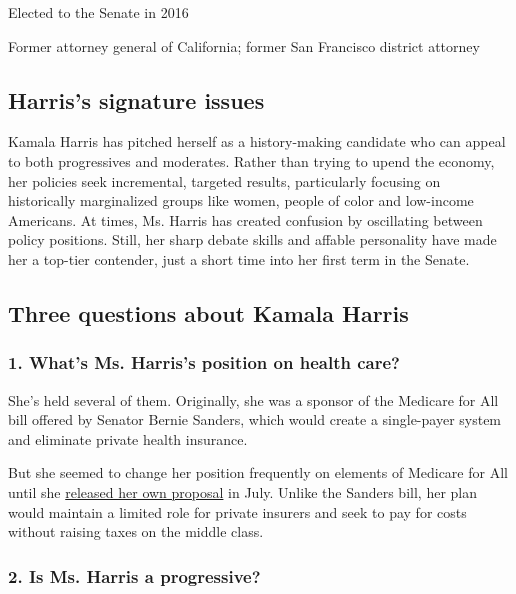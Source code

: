 Elected to the Senate in 2016

Former attorney general of California; former San Francisco district
attorney

\hypertarget{harriss-signature-issues}{%
\subsection{Harris's signature issues}\label{harriss-signature-issues}}

Kamala Harris has pitched herself as a history-making candidate who can
appeal to both progressives and moderates. Rather than trying to upend
the economy, her policies seek incremental, targeted results,
particularly focusing on historically marginalized groups like women,
people of color and low-income Americans. At times, Ms. Harris has
created confusion by oscillating between policy positions. Still, her
sharp debate skills and affable personality have made her a top-tier
contender, just a short time into her first term in the Senate.

\hypertarget{three-questions-about-kamala-harris}{%
\subsection{Three questions about Kamala
Harris}\label{three-questions-about-kamala-harris}}

\hypertarget{1-whats-ms-harriss-position-on-health-care}{%
\subsubsection{\texorpdfstring{\textbf{1. What's Ms. Harris's position
on health
care?}}{1. What's Ms. Harris's position on health care?}}\label{1-whats-ms-harriss-position-on-health-care}}

She's held several of them. Originally, she was a sponsor of the
Medicare for All bill offered by Senator Bernie Sanders, which would
create a single-payer system and eliminate private health insurance.

But she seemed to change her position frequently on elements of Medicare
for All until she
\href{https://www.nytimes.com/2019/07/29/us/politics/kamala-harris-medicare-for-all.html}{released
her own proposal} in July. Unlike the Sanders bill, her plan would
maintain a limited role for private insurers and seek to pay for costs
without raising taxes on the middle class.

\hypertarget{2-is-ms-harris-a-progressive}{%
\subsubsection{\texorpdfstring{\textbf{2. Is Ms. Harris a
progressive?}}{2. Is Ms. Harris a progressive?}}\label{2-is-ms-harris-a-progressive}}

